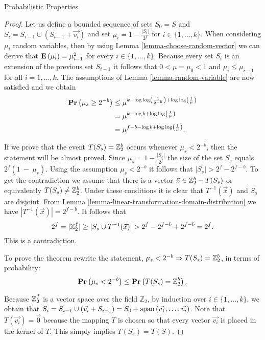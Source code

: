 \begin{section}{Probabilistic Properties}
\begin{proof}
Let us define a bounded sequence of sets $S_0 = S$ and $S_i = S_{i - 1} \cup (S_{i - 1} + \vec{v_i})$ and set $\mu_i = 1 - \frac{|S_i|}{2 ^ f}$ for $i \in \{ 1, \dots, k \}$. When considering $\mu_i$ random variables, then by using Lemma \ref{lemma-choose-random-vector}  we can derive that $\mathbf{E}\left(\mu_i\right) = \mu_{i - 1} ^ 2$ for every $i \in \{1, \dots, k \}$. Because every set $S_i$ is an extension of the previous set $S_{i - 1}$ it follows that $0 < \mu = \mu_0 < 1$ and $\mu_i \leq \mu_{i - 1}$ for all $i = 1, \dots, k$. The assumptions of Lemma \ref{lemma-random-variable} are now satisfied and we obtain
\[
\begin{split}
\mathbf{Pr}\left(\mu_s \geq 2 ^ {-b}\right) 
	& \leq \mu ^ {k - \log \log \left(\frac{1}{2 ^ {-b}}\right) + \log \log \left( \frac{1}{\mu} \right)} \\
	& = \mu ^ {k - \log b + \log \log \left(\frac{1}{\mu}\right)} \\
	& = \mu ^ {f - b - \log b + \log \log \left(\frac{1}{\mu}\right)} \text{.}
\end{split}
\]

If we prove that the event $T(S_s) = \mathbb{Z}_{2}^{b}$ occurs whenever $\mu_s < 2^{-b}$, then the statement will be almost proved. Since $\mu_s = 1 - \frac{|S_s|}{2 ^ f}$ the size of the set $S_s$ equals ${2 ^ f}(1~-~\mu_s)$. Using the assumption $\mu_s < 2 ^ {-b}$ it follows that $|S_s| > 2 ^ f - 2 ^ {f - b}$. To get the contradiction we assume that there is a vector $\vec{x} \in \mathbb{Z}_{2}^{b} - T(S_s)$ or equivalently $T(S_s) \neq \mathbb{Z}_{2}^{b}$. Under these conditions it is clear that $T ^ {-1}(\vec{x})$ and $S_s$ are disjoint. From Lemma \ref{lemma-linear-transformation-domain-distribution} we have $|T ^ {-1}(\vec{x})| = 2 ^ {f - b}$. It follows that
\[
2 ^ f = |\mathbb{Z}_{2}^{f}| \geq |S_s \cup T^{-1}(\vec{x})| > 2 ^ f - 2 ^ {f - b} + 2 ^ {f - b} = 2 ^ f \text{.}
\]
This is a contradiction. 

To prove the theorem rewrite the statement, $\mu_s < 2 ^ {-b} \Rightarrow T(S_s) = \mathbb{Z}_{2}^{b}$, in terms of probability:
\[
	\mathbf{Pr}\left(\mu_s < 2^{-b}\right) \leq \mathbf{Pr}\left(T(S_s) = \mathbb{Z}_{2}^{b}\right) \text{.}
\]

Because $\mathbb{Z}_{2}^{f}$ is a vector space over the field $\mathbb{Z}_2$, by induction over $i \in \{ 1, \dots, k \}$, we obtain that $S_i = S_{i - 1} \cup (\vec{v_i} + S_{i - 1}) = S_0 + \mathrm{span}\left({\vec{v_1}, \dots, \vec{v_i}}\right)$. Note that $T(\vec{v_i}) = \vec{0}$ because the mapping $T$ is chosen so that every vector $\vec{v_i}$ is placed in the kernel of $T$. This simply implies $T(S_s) = T(S)$.


\end{proof}
\end{section}
